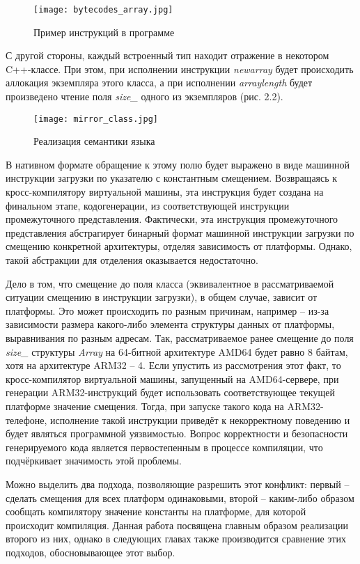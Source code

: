 \begin{figure}[H]
    \centering
    \texttt{[image: bytecodes\_array.jpg]}
    \caption{Пример инструкций в программе}
\end{figure}

С другой стороны, каждый встроенный тип находит отражение в некотором C++-классе. При этом, при исполнении инструкции \textit{newarray} будет происходить аллокация экземпляра этого класса, а при исполнении \textit{arraylength} будет произведено чтение поля \textit{size\_} одного из экземпляров (рис. 2.2).

\begin{figure}[H]
    \centering
    \texttt{[image: mirror\_class.jpg]}
    \caption{Реализация семантики языка}
\end{figure}

В нативном формате обращение к этому полю будет выражено в виде машинной инструкции загрузки по указателю с константным смещением.
Возвращаясь к кросс-компилятору виртуальной машины, эта инструкция будет создана на финальном этапе, кодогенерации, из соответствующей инструкции промежуточного представления.
Фактически, эта инструкция промежуточного представления абстрагирует бинарный формат машинной инструкции загрузки по смещению конкретной архитектуры, отделяя зависимость от платформы.
Однако, такой абстракции для отделения оказывается недостаточно.
\par
Дело в том, что смещение до поля класса (эквивалентное в рассматриваемой ситуации смещению в инструкции загрузки), в общем случае, зависит от платформы.
Это может происходить по разным причинам, например -- из-за зависимости размера какого-либо элемента структуры данных от платформы, выравнивания по разным адресам.
Так, рассматриваемое ранее смещение до поля \textit{size\_} структуры \textit{Array} на 64-битной архитектуре AMD64 будет равно 8 байтам, хотя на архитектуре ARM32 -- 4.
Если упустить из рассмотрения этот факт, то кросс-компилятор виртуальной машины, запущенный на AMD64-сервере, при генерации ARM32-инструкций будет использовать соответствующее текущей платформе значение смещения.
Тогда, при запуске такого кода на ARM32-телефоне, исполнение такой инструкции приведёт к некорректному поведению и будет являться программной уязвимостью.
Вопрос корректности и безопасности генерируемого кода является первостепенным в процессе компиляции, что подчёркивает значимость этой проблемы.
\par
Можно выделить два подхода, позволяющие разрешить этот конфликт: первый -- сделать смещения для всех платформ одинаковыми, второй -- каким-либо образом сообщать компилятору значение константы на платформе, для которой происходит компиляция. Данная работа посвящена главным образом реализации второго из них, однако в следующих главах также производится сравнение этих подходов, обосновывающее этот выбор.


